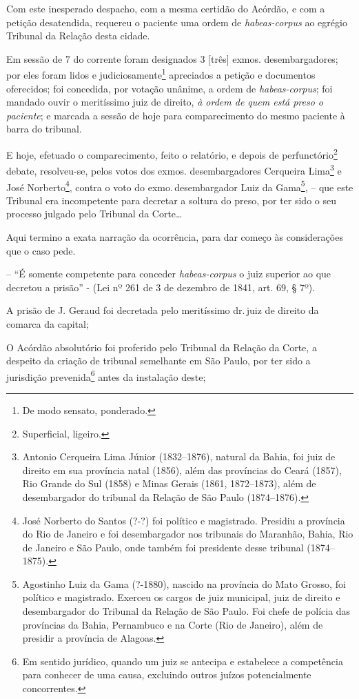Com este inesperado despacho, com a mesma certidão do Acórdão, e com a
petição desatendida, requereu o paciente uma ordem de
\emph{habeas-corpus} ao egrégio Tribunal da Relação desta cidade.

Em sessão de 7 do corrente foram designados 3 {[}três{]} exmos.
desembargadores; por eles foram lidos e judiciosamente\footnote{ De
  modo sensato, ponderado.} apreciados a petição e documentos
oferecidos; foi concedida, por votação unânime, a ordem de
\emph{habeas-corpus}; foi mandado ouvir o meritíssimo juiz de direito,
\emph{à ordem de quem está preso o paciente}; e marcada a sessão de hoje
para comparecimento do mesmo paciente à barra do tribunal.

E hoje, efetuado o comparecimento, feito o relatório, e depois de
perfunctório\footnote{ Superficial, ligeiro.} debate, resolveu-se,
pelos votos dos exmos. desembargadores Cerqueira Lima\footnote{ Antonio
  Cerqueira Lima Júnior (1832--1876), natural da Bahia, foi juiz de
  direito em sua província natal (1856), além das províncias do Ceará
  (1857), Rio Grande do Sul (1858) e Minas Gerais (1861, 1872--1873),
  além de desembargador do tribunal da Relação de São Paulo (1874--1876).}
e José Norberto\footnote{ José Norberto do Santos (?-?) foi político e
  magistrado. Presidiu a província do Rio de Janeiro e foi desembargador
  nos tribunais do Maranhão, Bahia, Rio de Janeiro e São Paulo, onde
  também foi presidente desse tribunal (1874--1875).}, contra o voto do
exmo.\,desembargador Luiz da Gama\footnote{ Agostinho Luiz da Gama
  (?-1880), nascido na província do Mato Grosso, foi político e
  magistrado. Exerceu os cargos de juiz municipal, juiz de direito e
  desembargador do Tribunal da Relação de São Paulo. Foi chefe de
  polícia das províncias da Bahia, Pernambuco e na Corte (Rio de
  Janeiro), além de presidir a província de Alagoas.}, -- que este
Tribunal era incompetente para decretar a soltura do preso, por ter sido
o seu processo julgado pelo Tribunal da Corte\ldots{}

Aqui termino a exata narração da ocorrência, para dar começo às
considerações que o caso pede.

-- ``É somente competente para conceder \emph{habeas-corpus} o juiz
superior ao que decretou a prisão'' - (Lei nº 261 de 3 de dezembro de
1841, art. 69, § 7º).

A prisão de J. Geraud foi decretada pelo meritíssimo dr.\,juiz de direito
da comarca da capital;

O Acórdão absolutório foi proferido pelo Tribunal da Relação da Corte, a
despeito da criação de tribunal semelhante em São Paulo, por ter sido a
jurisdição prevenida\footnote{ Em sentido jurídico, quando um juiz se
  antecipa e estabelece a competência para conhecer de uma causa,
  excluindo outros juízos potencialmente concorrentes.} antes da
instalação deste;

